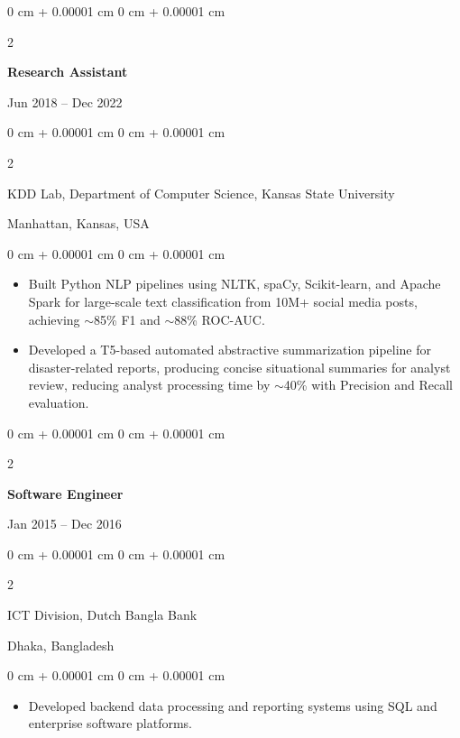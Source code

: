 \documentclass[10pt, letterpaper]{article}
\newenvironment{highlights}{
    \begin{itemize}[
        topsep=0.10 cm,
        parsep=0.10 cm,
        partopsep=0pt,
        itemsep=0pt,
        leftmargin=0 cm + 10pt
    ]
}{
    \end{itemize}
} %
\newenvironment{onecolentry}{
    \begin{adjustwidth}{
        0 cm + 0.00001 cm
    }{
        0 cm + 0.00001 cm
    }
}{
    \end{adjustwidth}
} %
\newenvironment{twocolentry}[2][]{
    \onecolentry
    \def\secondColumn{#2}
    \setcolumnwidth{\fill, 4.5 cm}
    \begin{paracol}{2}
}{
    \switchcolumn \raggedleft \secondColumn
    \end{paracol}
    \endonecolentry
} %
\begin{document}
    \vspace{1mm}
    
    \begin{twocolentry}{Jun 2018 -- Dec 2022}
        \textbf{Research Assistant}
    \end{twocolentry}
    \begin{twocolentry}{Manhattan, Kansas, USA}
       KDD Lab, Department of Computer Science, Kansas State University
    \end{twocolentry}
    \vspace{0.10 cm}
    \begin{onecolentry}
        \begin{highlights}
            \item Built Python NLP pipelines using NLTK, spaCy, Scikit-learn, and Apache Spark for large-scale text classification from 10M+ social media posts, achieving $\sim$85\% F1 and $\sim$88\% ROC-AUC.
            \item Developed a T5-based automated abstractive summarization pipeline for disaster-related reports, producing concise situational summaries for analyst review, reducing analyst processing time by $\sim$40\% with Precision and Recall evaluation.
        \end{highlights}
    \end{onecolentry}

    \vspace{0.1 cm}
    \begin{twocolentry}{Jan 2015 -- Dec 2016}
        \textbf{Software Engineer}
    \end{twocolentry}
    \begin{twocolentry}{Dhaka, Bangladesh}
       ICT Division, Dutch Bangla Bank
    \end{twocolentry}
    
    \begin{onecolentry}
        \begin{highlights}
            \item Developed backend data processing and reporting systems using SQL and enterprise software platforms.
        \end{highlights}
    \end{onecolentry}
    
\end{document}
